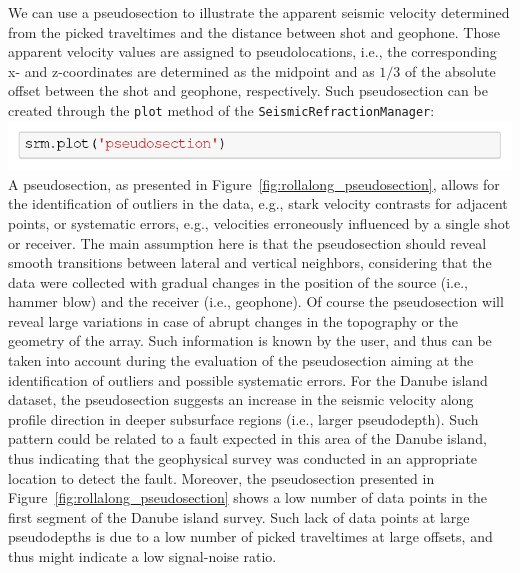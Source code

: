 \documentclass[a4paper,fleqn]{cas-sc}
\begin{document}
We can use a pseudosection to illustrate the apparent seismic velocity determined from the picked traveltimes and the distance between shot and geophone. Those apparent velocity values are assigned to pseudolocations, i.e., the corresponding x- and z-coordinates are determined as the midpoint and as $1/3$ of the absolute offset between the shot and geophone, respectively.
Such pseudosection can be created through the \texttt{plot} method of the \texttt{SeismicRefractionManager}:
\newline
\includegraphics[width=.5\textwidth]{./figures/plotpseudosection_danube.pdf}
\newline
A pseudosection, as presented in Figure~\ref{fig:rollalong_pseudosection}, allows for the identification of outliers in the data, e.g., stark velocity contrasts for adjacent points, or systematic errors, e.g., velocities erroneously influenced by a single shot or receiver. The main assumption here is that the pseudosection should reveal smooth transitions between lateral and vertical neighbors, considering that the data were collected with gradual changes in the position of the source (i.e., hammer blow) and the receiver (i.e., geophone). Of course the pseudosection will reveal large variations in case of abrupt changes in the topography or the geometry of the array. Such information is known by the user, and thus can be taken into account during the evaluation of the pseudosection aiming at the identification of outliers and possible systematic errors.
For the Danube island dataset, the pseudosection suggests an increase in the seismic velocity along profile direction in deeper subsurface regions (i.e., larger pseudodepth). Such pattern could be related to a fault expected in this area of the Danube island, thus indicating that the geophysical survey was conducted in an appropriate location to detect the fault.
Moreover, the pseudosection presented in Figure~\ref{fig:rollalong_pseudosection} shows a low number of data points in the first segment of the Danube island survey. Such lack of data points at large pseudodepths is due to a low number of picked traveltimes at large offsets, and thus might indicate a low signal-noise ratio.
\end{document}
